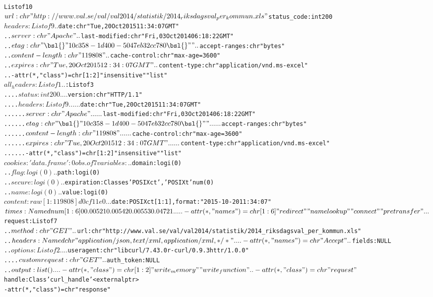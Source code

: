 \documentclass[a4paper]{book}
\begin{document}
\begin{Format}
\begin{alltt}List of 10
 $ url        : chr "http://www.val.se/val/val2014/statistik/2014_riksdagsval_per_kommun.xls"
 $ status_code: int 200
 $ headers    :List of 9
  ..$ date          : chr "Tue, 20 Oct 2015 11:34:07 GMT"
  ..$ server        : chr "Apache"
  ..$ last-modified : chr "Fri, 03 Oct 2014 06:18:22 GMT"
  ..$ etag          : chr "\bsl{}"10c358-1d400-5047eb32cc780\bsl{}""
  ..$ accept-ranges : chr "bytes"
  ..$ content-length: chr "119808"
  ..$ cache-control : chr "max-age=3600"
  ..$ expires       : chr "Tue, 20 Oct 2015 12:34:07 GMT"
  ..$ content-type  : chr "application/vnd.ms-excel"
  ..- attr(*, "class")= chr [1:2] "insensitive" "list"
 $ all_headers:List of 1
  ..$ :List of 3
  .. ..$ status : int 200
  .. ..$ version: chr "HTTP/1.1"
  .. ..$ headers:List of 9
  .. .. ..$ date          : chr "Tue, 20 Oct 2015 11:34:07 GMT"
  .. .. ..$ server        : chr "Apache"
  .. .. ..$ last-modified : chr "Fri, 03 Oct 2014 06:18:22 GMT"
  .. .. ..$ etag          : chr "\bsl{}"10c358-1d400-5047eb32cc780\bsl{}""
  .. .. ..$ accept-ranges : chr "bytes"
  .. .. ..$ content-length: chr "119808"
  .. .. ..$ cache-control : chr "max-age=3600"
  .. .. ..$ expires       : chr "Tue, 20 Oct 2015 12:34:07 GMT"
  .. .. ..$ content-type  : chr "application/vnd.ms-excel"
  .. .. ..- attr(*, "class")= chr [1:2] "insensitive" "list"
 $ cookies    :'data.frame':	0 obs. of  7 variables:
  ..$ domain    : logi(0) 
  ..$ flag      : logi(0) 
  ..$ path      : logi(0) 
  ..$ secure    : logi(0) 
  ..$ expiration:Classes 'POSIXct', 'POSIXt'  num(0) 
  ..$ name      : logi(0) 
  ..$ value     : logi(0) 
 $ content    : raw [1:119808] d0 cf 11 e0 ...
 $ date       : POSIXct[1:1], format: "2015-10-20 11:34:07"
 $ times      : Named num [1:6] 0 0.00521 0.00542 0.00553 0.04721 ...
  ..- attr(*, "names")= chr [1:6] "redirect" "namelookup" "connect" "pretransfer" ...
 $ request    :List of 7
  ..$ method    : chr "GET"
  ..$ url       : chr "http://www.val.se/val/val2014/statistik/2014_riksdagsval_per_kommun.xls"
  ..$ headers   : Named chr "application/json, text/xml, application/xml, */*"
  .. ..- attr(*, "names")= chr "Accept"
  ..$ fields    : NULL
  ..$ options   :List of 2
  .. ..$ useragent    : chr "libcurl/7.43.0 r-curl/0.9.3 httr/1.0.0"
  .. ..$ customrequest: chr "GET"
  ..$ auth_token: NULL
  ..$ output    : list()
  .. ..- attr(*, "class")= chr [1:2] "write_memory" "write_function"
  ..- attr(*, "class")= chr "request"
 $ handle     :Class 'curl_handle' <externalptr> 
 - attr(*, "class")= chr "response"
\end{alltt}
\end{Format}
\end{document}
